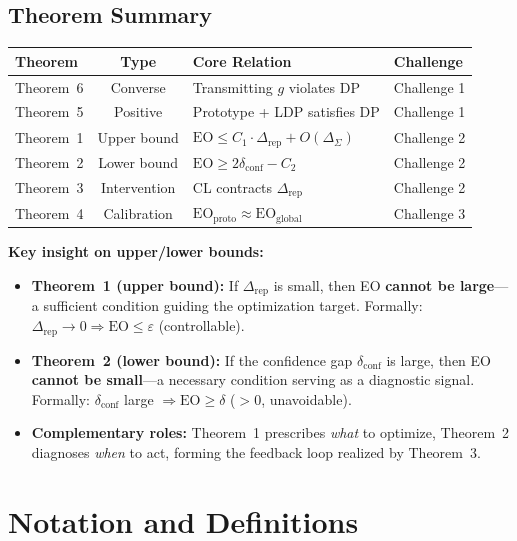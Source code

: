 \documentclass[11pt]{article}
\begin{document}
\subsection{Theorem Summary}

\begin{table}[h]
\centering
\begin{tabular}{|l|c|l|l|}
\hline
\textbf{Theorem} & \textbf{Type} & \textbf{Core Relation} & \textbf{Challenge} \\
\hline
Theorem~6 & Converse & Transmitting $g$ violates DP & Challenge 1 \\
\hline
Theorem~5 & Positive & Prototype + LDP satisfies DP & Challenge 1 \\
\hline
Theorem~1 & Upper bound & $\mathrm{EO} \leq C_1\cdot\Delta_{\mathrm{rep}} + O(\Delta_{\Sigma})$ & Challenge 2 \\
\hline
Theorem~2 & Lower bound & $\mathrm{EO} \geq 2\delta_{\mathrm{conf}} - C_2$ & Challenge 2 \\
\hline
Theorem~3 & Intervention & CL contracts $\Delta_{\mathrm{rep}}$ & Challenge 2 \\
\hline
Theorem~4 & Calibration & $\mathrm{EO}_{\mathrm{proto}} \approx \mathrm{EO}_{\mathrm{global}}$ & Challenge 3 \\
\hline
\end{tabular}
\end{table}

\textbf{Key insight on upper/lower bounds:}
\begin{itemize}
    \item \textbf{Theorem~1 (upper bound):} If $\Delta_{\mathrm{rep}}$ is small, then EO \textbf{cannot be large}---a sufficient condition guiding the optimization target. Formally: $\Delta_{\mathrm{rep}} \to 0 \Rightarrow \mathrm{EO} \leq \varepsilon$ (controllable).
    \item \textbf{Theorem~2 (lower bound):} If the confidence gap $\delta_{\mathrm{conf}}$ is large, then EO \textbf{cannot be small}---a necessary condition serving as a diagnostic signal. Formally: $\delta_{\mathrm{conf}}$ large $\Rightarrow \mathrm{EO} \geq \delta$ ($>0$, unavoidable).
    \item \textbf{Complementary roles:} Theorem~1 prescribes \textit{what} to optimize, Theorem~2 diagnoses \textit{when} to act, forming the feedback loop realized by Theorem~3.
\end{itemize}

\section{Notation and Definitions}
\end{document}
